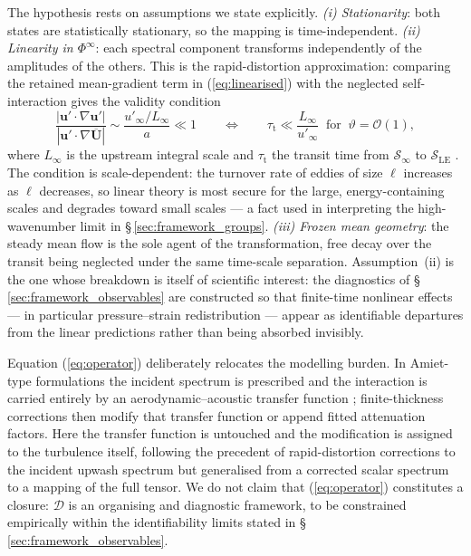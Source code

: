 \documentclass[lineno]{JFM-FLM_Au}
\begin{document}
The hypothesis rests on assumptions we state explicitly.
\emph{(i) Stationarity}: both states are statistically stationary, so the
mapping is time-independent. \emph{(ii) Linearity in $\Phi^{\infty}$}:
each spectral component transforms independently of the amplitudes of the
others. This is the rapid-distortion approximation: comparing the retained
mean-gradient term in (\ref{eq:linearised}) with the neglected
self-interaction gives the validity condition
\begin{equation}
  \frac{|\boldsymbol{u}'\!\cdot\!\nabla\boldsymbol{u}'|}
       {|\boldsymbol{u}'\!\cdot\!\nabla\overline{\boldsymbol{U}}|}
  \sim \frac{u'_\infty/L_\infty}{a} \ll 1
  \qquad\Longleftrightarrow\qquad
  \tau_{\mathrm{t}} \ll \frac{L_\infty}{u'_\infty}
  \;\;\text{for}\;\; \vartheta = \mathcal{O}(1),
  \label{eq:rdt_condition}
\end{equation}
where $L_\infty$ is the upstream integral scale and $\tau_{\mathrm{t}}$
the transit time from $\mathcal{S}_\infty$ to $\mathcal{S}_{\mathrm{LE}}$
\citep{BatchelorProudman1954,HuntCarruthers1990}. The condition is
scale-dependent: the turnover rate of eddies of size $\ell$ increases as
$\ell$ decreases, so linear theory is most secure for the large,
energy-containing scales and degrades toward small scales --- a fact used
in interpreting the high-wavenumber limit in
\S\,\ref{sec:framework_groups}. \emph{(iii) Frozen mean geometry}: the
steady mean flow is the sole agent of the transformation, free decay over
the transit being neglected under the same time-scale separation.
Assumption~(ii) is the one whose breakdown is itself of scientific
interest: the diagnostics of \S\,\ref{sec:framework_observables} are
constructed so that finite-time nonlinear effects --- in particular
pressure--strain redistribution
\citep{SpezialeSarkarGatski1991,DurbinReif2017} --- appear as identifiable
departures from the linear predictions rather than being absorbed
invisibly.

Equation (\ref{eq:operator}) deliberately relocates the modelling burden.
In Amiet-type formulations the incident spectrum is prescribed and the
interaction is carried entirely by an aerodynamic--acoustic transfer
function \citep{Amiet1975}; finite-thickness corrections then modify that
transfer function or append fitted attenuation factors. Here the transfer
function is untouched and the modification is assigned to the turbulence
itself, following the precedent of rapid-distortion corrections to the
incident upwash spectrum \citep{deSantana2016} but generalised from a
corrected scalar spectrum to a mapping of the full tensor. We do not claim
that (\ref{eq:operator}) constitutes a closure: $\mathcal{D}$ is an
organising and diagnostic framework, to be constrained empirically within
the identifiability limits stated in
\S\,\ref{sec:framework_observables}.
\end{document}
